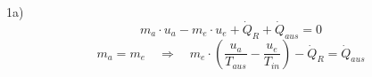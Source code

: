 1a)
\[
m_a \cdot u_a - m_e \cdot u_e + \dot{Q}_R + \dot{Q}_{aus} = 0
\]
\[
m_a = m_e \quad \Rightarrow \quad m_e \cdot \left( \frac{u_a}{T_{aus}} - \frac{u_e}{T_{in}} \right) - \dot{Q}_R = \dot{Q}_{aus}
\]